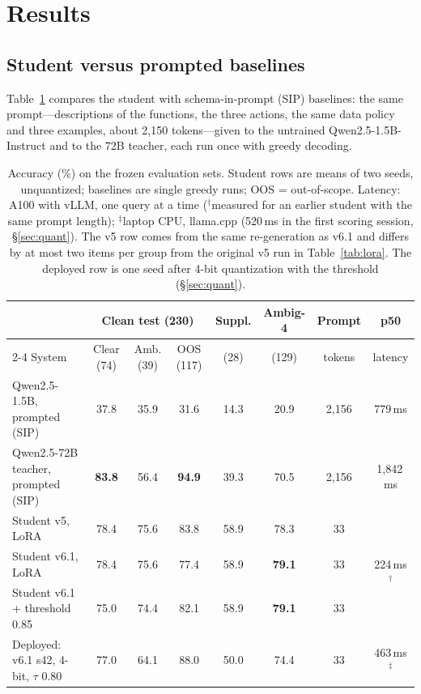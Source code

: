 \section{Results}
\label{sec:results}

\subsection{Student versus prompted baselines}
\label{sec:main}

Table~\ref{tab:main} compares the student with schema-in-prompt (SIP) baselines: the same prompt---descriptions of the
functions, the three actions, the same data policy and three examples, about 2,150 tokens---given to the untrained
Qwen2.5-1.5B-Instruct and to the 72B teacher, each run once with greedy decoding.

\begin{table}[t]
\centering\small
\setlength{\tabcolsep}{5pt}
\begin{tabular}{@{}lccccccc@{}}
\toprule
& \multicolumn{3}{c}{Clean test (230)} & Suppl. & Ambig-4 & Prompt & p50 \\
\cmidrule(lr){2-4}
System & Clear (74) & Amb. (39) & OOS (117) & (28) & (129) & tokens & latency \\
\midrule
Qwen2.5-1.5B, prompted (SIP) & 37.8 & 35.9 & 31.6 & 14.3 & 20.9 & 2,156 & 779\,ms \\
Qwen2.5-72B teacher, prompted (SIP) & \textbf{83.8} & 56.4 & \textbf{94.9} & 39.3 & 70.5 & 2,156 & 1,842\,ms \\
\midrule
Student v5, LoRA & 78.4 & 75.6 & 83.8 & 58.9 & 78.3 & 33 & \multirow{3}{*}{224\,ms$^{\dagger}$} \\
Student v6.1, LoRA & 78.4 & 75.6 & 77.4 & 58.9 & \textbf{79.1} & 33 & \\
Student v6.1 + threshold 0.85 & 75.0 & 74.4 & 82.1 & 58.9 & \textbf{79.1} & 33 & \\
\midrule
Deployed: v6.1 s42, 4-bit, $\tau$ 0.80 & 77.0 & 64.1 & 88.0 & 50.0 & 74.4 & 33 & 463\,ms$^{\ddagger}$ \\
\bottomrule
\end{tabular}
\caption{Accuracy (\%) on the frozen evaluation sets. Student rows are means of two seeds, unquantized; baselines are single
greedy runs; OOS = out-of-scope. Latency: A100 with vLLM, one query at a time ($^{\dagger}$measured for an earlier student
with the same prompt length); $^{\ddagger}$laptop CPU, llama.cpp (520\,ms in the first scoring session,
\S\ref{sec:quant}). The v5 row comes from the same re-generation as v6.1 and differs by at most two items per group from the original v5
run in Table~\ref{tab:lora}. The deployed row is one seed after 4-bit quantization with the threshold
(\S\ref{sec:quant}).}
\label{tab:main}
\end{table}

